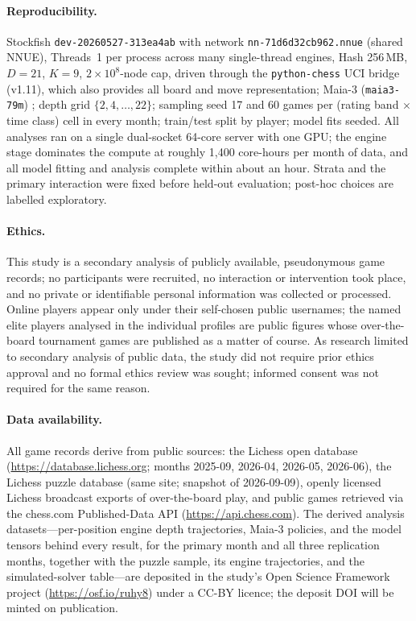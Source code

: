 \paragraph{Reproducibility.}
Stockfish \texttt{dev-20260527-313ea4ab} with network \texttt{nn-71d6d32cb962.nnue}
(shared NNUE), Threads~1 per process across many single-thread engines, Hash
256\,MB, $D{=}21$, $K{=}9$, $2\times10^{8}$-node cap, driven through the \texttt{python-chess}
UCI bridge (v1.11), which also provides all board and move representation; Maia-3
(\texttt{maia3-79m}) \citep{monroe2026}; depth grid
$\{2,4,\dots,22\}$; sampling seed 17 and 60 games per (rating band $\times$ time class) cell
in every month; train/test split by player; model fits seeded. All analyses ran on a single
dual-socket 64-core server with one GPU; the engine stage dominates the compute at roughly
1{,}400 core-hours per month of data, and all model fitting and analysis complete within
about an hour. Strata and the primary
interaction were fixed before held-out evaluation; post-hoc choices are labelled exploratory.

\paragraph{Ethics.}
This study is a secondary analysis of publicly available, pseudonymous game records; no
participants were recruited, no interaction or intervention took place, and no private or
identifiable personal information was collected or processed. Online players appear only
under their self-chosen public usernames; the named elite players analysed in the individual
profiles are public figures whose over-the-board tournament games are published as a matter
of course. As research limited to secondary analysis of public data, the study did not
require prior ethics approval and no formal ethics review was sought; informed consent was
not required for the same reason.

\paragraph{Data availability.}
All game records derive from public sources: the Lichess open database
(\url{https://database.lichess.org}; months 2025-09, 2026-04, 2026-05, 2026-06), the Lichess
puzzle database (same site; snapshot of 2026-09-09), openly
licensed Lichess broadcast exports of over-the-board play, and public games retrieved via the
chess.com Published-Data API (\url{https://api.chess.com}). The derived analysis
datasets---per-position engine depth trajectories, Maia-3 policies, and the model tensors
behind every result, for the primary month and all three replication months, together with the
puzzle sample, its engine trajectories, and the simulated-solver table---are deposited
in the study's Open Science Framework project (\url{https://osf.io/ruhy8}) under a CC-BY
licence; the deposit DOI will be minted on publication.

